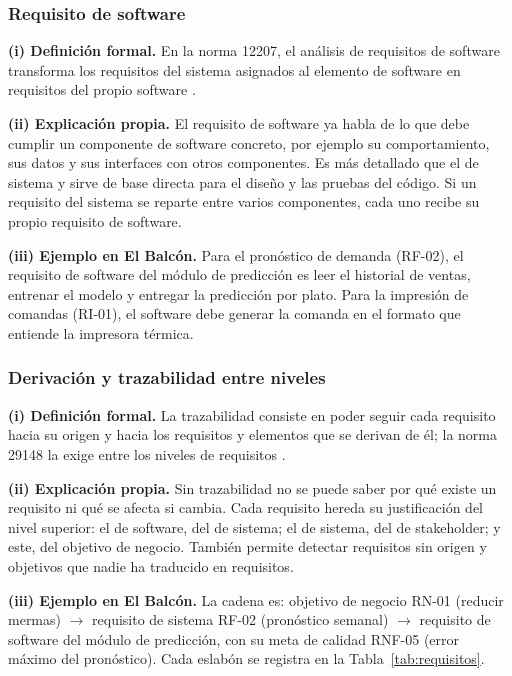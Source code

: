 \subsubsection{Requisito de software}
\textbf{(i) Definici\'on formal.} En la norma 12207, el an\'alisis de requisitos de software transforma los requisitos del sistema asignados al elemento de software en requisitos del propio software \cite{ieee12207,iso29148}. %
\par
\textbf{(ii) Explicaci\'on propia.} El requisito de software ya habla de lo que debe cumplir un componente de software concreto, por ejemplo su comportamiento, sus datos y sus interfaces con otros componentes. Es m\'as detallado que el de sistema y sirve de base directa para el dise\~no y las pruebas del c\'odigo. Si un requisito del sistema se reparte entre varios componentes, cada uno recibe su propio requisito de software.\par
\textbf{(iii) Ejemplo en El Balc\'on.} Para el pron\'ostico de demanda (RF-02), el requisito de software del m\'odulo de predicci\'on es leer el historial de ventas, entrenar el modelo y entregar la predicci\'on por plato. Para la impresi\'on de comandas (RI-01), el software debe generar la comanda en el formato que entiende la impresora t\'ermica.\par

\subsubsection{Derivaci\'on y trazabilidad entre niveles}
\textbf{(i) Definici\'on formal.} La trazabilidad consiste en poder seguir cada requisito hacia su origen y hacia los requisitos y elementos que se derivan de \'el; la norma 29148 la exige entre los niveles de requisitos \cite{iso29148}.\par
\textbf{(ii) Explicaci\'on propia.} Sin trazabilidad no se puede saber por qu\'e existe un requisito ni qu\'e se afecta si cambia. Cada requisito hereda su justificaci\'on del nivel superior: el de software, del de sistema; el de sistema, del de stakeholder; y este, del objetivo de negocio. Tambi\'en permite detectar requisitos sin origen y objetivos que nadie ha traducido en requisitos.\par
\textbf{(iii) Ejemplo en El Balc\'on.} La cadena es: objetivo de negocio RN-01 (reducir mermas) $\rightarrow$ requisito de sistema RF-02 (pron\'ostico semanal) $\rightarrow$ requisito de software del m\'odulo de predicci\'on, con su meta de calidad RNF-05 (error m\'aximo del pron\'ostico). Cada eslab\'on se registra en la Tabla~\ref{tab:requisitos}.\par
